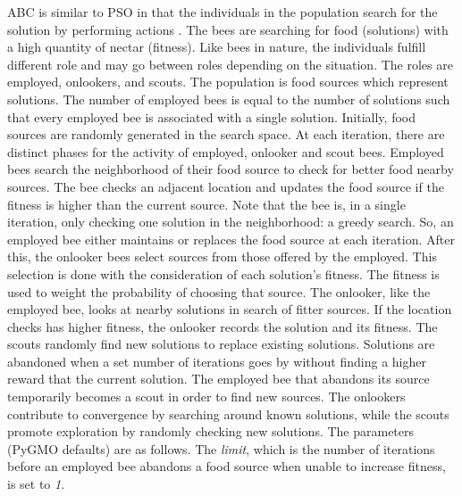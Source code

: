 \documentclass{tamuccthesis}
\begin{document}
ABC is similar to PSO in that the individuals in the population search for the solution by performing actions \cite{bee_ga:carballo:2017}. The bees are searching for food (solutions) with a high quantity of nectar (fitness). Like bees in nature, the individuals fulfill different role and may go between roles depending on the situation. The roles are employed, onlookers, and scouts. The population is food sources which represent solutions. The number of employed bees is equal to the number of solutions such that every employed bee is associated with a single solution. Initially, food sources are randomly generated in the search space. At each iteration, there are distinct phases for the activity of employed, onlooker and scout bees. Employed bees search the neighborhood of their food source to check for better food nearby sources. The bee checks an adjacent location and updates the food source if the fitness is higher than the current source. Note that the bee is, in a single iteration, only checking one solution in the neighborhood: a greedy search. So, an employed bee either maintains or replaces the food source at each iteration. After this, the onlooker bees select sources from those offered by the employed. This selection is done with the consideration of each solution's fitness. The fitness is used to weight the probability of choosing that source. The onlooker, like the employed bee, looks at nearby solutions in search of fitter sources. If the location checks has higher fitness, the onlooker records the solution and its fitness. The scouts randomly find new solutions to replace existing solutions. Solutions are abandoned when a set number of iterations goes by without finding a higher reward that the current solution. The employed bee that abandons its source temporarily becomes a scout in order to find new sources. The onlookers contribute to convergence by searching around known solutions, while the scouts promote exploration by randomly checking new solutions.  The parameters (PyGMO defaults) are as follows. The \textit{limit}, which is the number of iterations before an employed bee abandons a food source when unable to increase fitness, is set to \textit{1}. 
\end{document}
